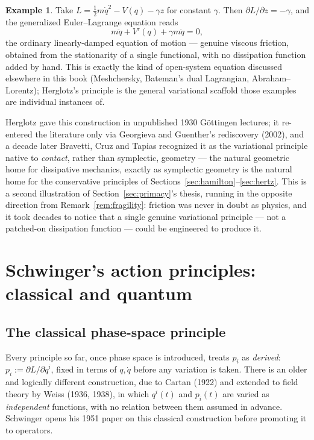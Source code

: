\documentclass[11pt]{book}
\theoremstyle{definition}
\newtheorem{example}[definition]{Example}
\theoremstyle{plain}
\theoremstyle{remark}
\begin{document}
\begin{example}
Take $L=\tfrac12 m\dot q^2 - V(q) - \gamma z$ for constant $\gamma$. Then $\partial L/\partial z=-\gamma$, and the generalized Euler--Lagrange equation reads
\[
m\ddot q + V'(q) + \gamma m\dot q = 0,
\]
the ordinary linearly-damped equation of motion --- genuine viscous friction, obtained from the stationarity of a single functional, with no dissipation function added by hand. This is exactly the kind of open-system equation discussed elsewhere in this book (Meshchersky, Bateman's dual Lagrangian, Abraham--Lorentz); Herglotz's principle is the general variational scaffold those examples are individual instances of.
\end{example}

Herglotz gave this construction in unpublished 1930 Göttingen lectures; it re-entered the literature only via Georgieva and Guenther's rediscovery (2002), and a decade later Bravetti, Cruz and Tapias recognized it as the variational principle native to \emph{contact}, rather than symplectic, geometry --- the natural geometric home for dissipative mechanics, exactly as symplectic geometry is the natural home for the conservative principles of Sections~\ref{sec:hamilton}--\ref{sec:hertz}. This is a second illustration of Section~\ref{sec:primacy}'s thesis, running in the opposite direction from Remark~\ref{rem:fragility}: friction was never in doubt as physics, and it took decades to notice that a single genuine variational principle --- not a patched-on dissipation function --- could be engineered to produce it.

\section{Schwinger's action principles: classical and quantum}
\label{sec:schwinger}

\subsection{The classical phase-space principle}
\label{sec:schwinger-classical}

Every principle so far, once phase space is introduced, treats $p_i$ as \emph{derived}: $p_i:=\partial L/\partial\dot q^i$, fixed in terms of $q,\dot q$ before any variation is taken. There is an older and logically different construction, due to Cartan (1922) and extended to field theory by Weiss (1936, 1938), in which $q^i(t)$ and $p_i(t)$ are varied as \emph{independent} functions, with no relation between them assumed in advance. Schwinger opens his 1951 paper on this classical construction before promoting it to operators.
\end{document}
